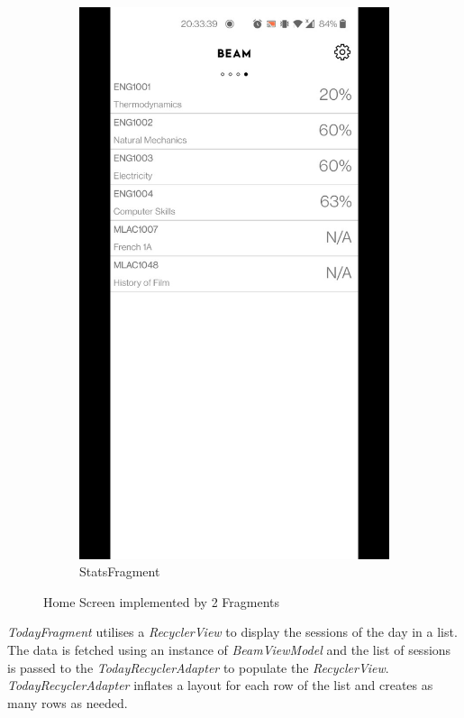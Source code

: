 \documentclass[../report.tex]{subfiles}
\begin{document}
\begin{figure} [H]
\begin{subfigure}[b]{0.28\textwidth}
		\includegraphics[width=\textwidth]{../images/07/02-app-stats.jpg}
		\caption{StatsFragment}
		\label{fig:app-stats-frag}
	\end{subfigure}
	\caption{Home Screen implemented by 2 Fragments}
	\label{fig:app-login-screen}
\end{figure}

\textit{TodayFragment} utilises a \textit{RecyclerView} to display the sessions of the day in a list. The data is fetched using an instance of \textit{BeamViewModel} and the list of sessions is passed to the \textit{TodayRecyclerAdapter} to populate the \textit{RecyclerView}. \textit{TodayRecyclerAdapter} inflates a layout for each row of the list and creates as many rows as needed.
\end{document}
